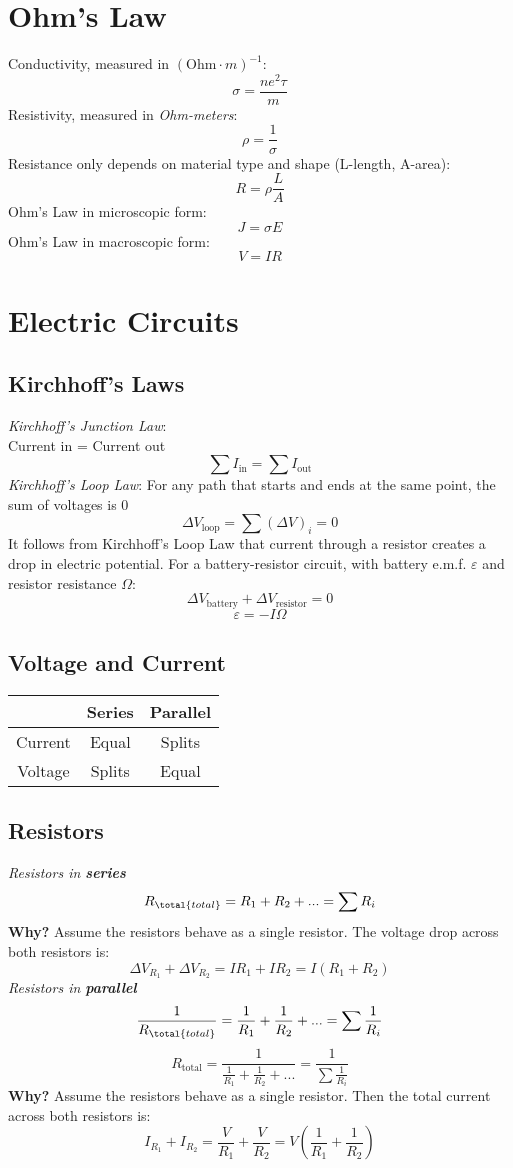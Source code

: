 \section{Ohm's Law}
Conductivity, measured in $(\text{Ohm}\cdot m)^{-1}$:
$$\sigma=\frac{ne^2\tau}{m}$$
Resistivity, measured in \emph{Ohm-meters}:
$$\rho=\frac{1}{\sigma}$$
Resistance only depends on material type and shape (L-length, A-area):
$$R=\rho\frac{L}{A}$$
Ohm's Law in microscopic form:
$$J=\sigma E$$
Ohm's Law in macroscopic form:
$$V=IR$$
\section{Electric Circuits}
\subsection{Kirchhoff's Laws}
\emph{Kirchhoff's Junction Law}: \\Current in = Current out
$$\sum I_{\text{in}} = \sum I_{\text{out}}$$
\emph{Kirchhoff's Loop Law}: For any path that starts and ends at the same point, the sum of voltages is 0
$$\Delta V_{\text{loop}}=\sum(\Delta V)_i=0$$
It follows from Kirchhoff's Loop Law that current through a resistor creates a drop in electric potential. For a battery-resistor circuit, with battery e.m.f. $\varepsilon$ and resistor resistance $\Omega$:
$$\Delta V_{\text{battery}} + \Delta V_{\text{resistor}} = 0$$
$$\varepsilon = -I\Omega$$
\subsection{Voltage and Current}
\begin{table}[H]
    \scriptsize
    \centering
    \begin{tabular}{|c|c|c|}
        \hline
        & Series & Parallel\\
        \hline
        Current & Equal & Splits\\
        \hline
        Voltage & Splits & Equal\\
        \hline
    \end{tabular}
\end{table}
\subsection{Resistors}
\emph{Resistors in \textbf{series}}
$$R_{\total{total}} = R_1 + R_2 + ... = \sum R_i$$
\textbf{Why?} Assume the resistors behave as a single resistor. The voltage drop across both resistors is:
$$\Delta V_{R_1} + \Delta V_{R_2} = IR_1 + IR_2 = I(R_1 + R_2)$$
\emph{Resistors in \textbf{parallel}}
$$\frac{1}{R_{\total{total}}}=\frac{1}{R_1} + \frac{1}{R_2} + ...=\sum\frac{1}{R_i}$$
$$R_{\text{total}}=\frac{1}{\frac{1}{R_1} + \frac{1}{R_2} + ...}=\frac{1}{\sum\frac{1}{R_i}}$$
\textbf{Why?} Assume the resistors behave as a single resistor. Then the total current across both resistors is:
$$I_{R_1} + I_{R_2} = \frac{V}{R_1}+\frac{V}{R_2}=V(\frac{1}{R_1}+\frac{1}{R_2})$$
